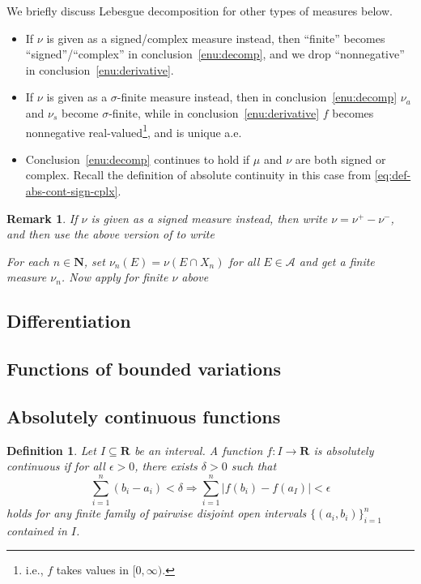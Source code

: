 \documentclass[10pt]{article}
\numberwithin{equation}{section}
\theoremstyle{plain-star}
\theoremstyle{definition-star}
\newtheorem{defn}[equation]{Definition}
\theoremstyle{remark-star}
\newtheorem{rem}[equation]{Remark}
\theoremstyle{plain-star}
\newcommand{\R}{\mathbf{R}}
\newcommand{\N}{\mathbf{N}}
\newcommand{\A}{\mathcal{A}}
\newcommand{\abs}[1]{\lvert #1 \rvert}
\renewcommand{\implies}{\Rightarrow}
\begin{document}
We briefly discuss Lebesgue decomposition for other types of measures below.
\begin{itemize}
    \item If $\nu$ is given as a signed/complex measure instead, then ``finite'' becomes ``signed''/``complex'' in conclusion~\ref{enu:decomp}, and we drop ``nonnegative'' in conclusion~\ref{enu:derivative}.
    \item If $\nu$ is given as a $\sigma$-finite measure instead, then in conclusion~\ref{enu:decomp} $\nu_a$ and $\nu_s$ become $\sigma$-finite, while in conclusion~\ref{enu:derivative} $f$ becomes nonnegative real-valued\footnote{i.e., $f$ takes values in $[0,\infty)$.}, and is unique a.e.
    \item Conclusion~\ref{enu:decomp} continues to hold if $\mu$ and $\nu$ are both signed or complex. Recall the definition of absolute continuity in this case from \eqref{eq:def-abs-cont-sign-cplx}.
\end{itemize}
\begin{rem}
    
    If $\nu$ is given as a signed measure instead, then write $\nu = \nu^+ - \nu^-$, and then use the above version of  to write
    
    For each $n\in \N$, set $\nu_n (E) = \nu(E\cap X_n)$ for all $E\in \A$ and get a finite measure $\nu_n$. Now apply  for finite $\nu$ above
\end{rem}
\subsection{Differentiation}
\subsection{Functions of bounded variations}
\subsection{Absolutely continuous functions}
\begin{defn}
    Let $I \subseteq \R$ be an interval. A function $f\colon I\to \R$ is absolutely continuous if for all $\epsilon > 0$, there exists $\delta > 0$ such that \[
        \sum_{i=1}^n (b_i - a_i) < \delta \implies \sum_{i=1}^n \abs{f(b_i) - f(a_I)} <\epsilon
    \] holds for any finite family of pairwise disjoint open intervals $\{(a_i,b_i)\}_{i=1}^n$ contained in $I$.
\end{defn}
\end{document}
